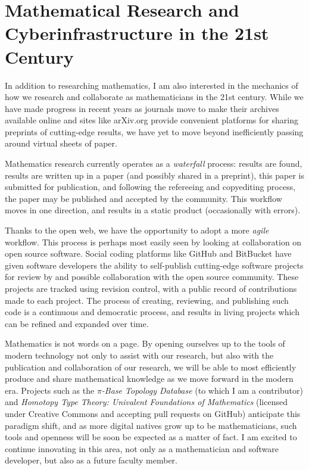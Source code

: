 \documentclass[11pt]{amsart}
\theoremstyle{plain}
\newcommand{\<}{\langle}
\renewcommand{\>}{\rangle}
\newcommand{\term}{\textit}
\begin{document}
\section*{Mathematical Research and Cyberinfrastructure in the 21st Century}

In addition to researching mathematics, I am also interested in the mechanics
of how we research and collaborate as mathematicians in the 21st century.
While we have made progress in recent years as journals move to make their
archives available online and sites like arXiv.org provide convenient platforms
for sharing preprints of cutting-edge results, we have yet to move beyond
inefficiently passing around virtual sheets of paper.

Mathematics research currently operates as a \term{waterfall} process: results
are found, results are written up in a paper (and possibly shared in a
preprint), this paper is submitted for publication, and following the refereeing
and copyediting process, the paper may be published and accepted by the
community. This workflow moves in one direction, and results in a static
product (occasionally with errors).

Thanks to the open web, we have the opportunity to adopt a more \term{agile}
workflow. This process is perhaps most
easily seen by looking at collaboration on open source software.
Social coding platforms like GitHub and BitBucket have given software
developers the ability to self-publish cutting-edge software projects for
review by and possible collaboration with the open source community. These
projects are tracked using revision control, with a public record of
contributions made to each project. The process of creating, reviewing, and
publishing such code is a continuous and democratic process, and results
in living projects which can be refined and expanded over time.

Mathematics is not words on a page. By opening ourselves up to the tools
of modern technology not only to assist with our research, but also with
the publication and collaboration of our research, we will be able to most
efficiently produce and share mathematical knowledge as we move forward in
the modern era. Projects such as the \textit{$\pi$-Base Topology Database}
(to which I am a contributor) and
\textit{Homotopy Type Theory: Univalent Foundations of Mathematics} \cite{hottbook}
(licensed under Creative Commons and accepting pull requests on GitHub)
anticipate this paradigm shift, and as more digital
natives grow up to be mathematicians, such tools and openness will be soon be
expected as a matter of fact. I am excited to continue innovating in this area,
not only as a mathematician and software developer, but also as a future faculty
member.






\end{document}
